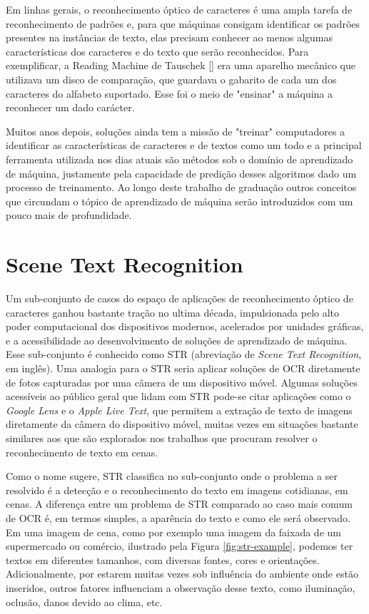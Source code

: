 Em linhas gerais, o reconhecimento óptico de caracteres é uma ampla tarefa de reconhecimento de padrões e, para que máquinas consigam identificar os padrões presentes na instâncias de texto, elas precisam conhecer ao menos algumas características dos caracteres e do texto que serão reconhecidos. Para exemplificar, a Reading Machine de Tauschek [] era uma aparelho mecânico que utilizava um disco de comparação, que guardava o gabarito de cada um dos caracteres do alfabeto suportado. Esse foi o meio de "ensinar" a máquina a reconhecer um dado carácter.

Muitos anos depois, soluções ainda tem a missão de "treinar" computadores a identificar as características de caracteres e de textos como um todo e a principal ferramenta utilizada nos dias atuais são métodos sob o domínio de aprendizado de máquina, justamente pela capacidade de predição desses algoritmos dado um processo de treinamento. Ao longo deste trabalho de graduação outros conceitos que circundam o tópico de aprendizado de máquina serão introduzidos com um pouco mais de profundidade.

\section{Scene Text Recognition}

Um sub-conjunto de casos do espaço de aplicações de reconhecimento óptico de caracteres ganhou bastante tração no ultima década, impulsionada pelo alto poder computacional dos dispositivos modernos, acelerados por unidades gráficas, e a acessibilidade ao desenvolvimento de soluções de aprendizado de máquina. Esse sub-conjunto é conhecido como STR (abreviação de \textit{Scene Text Recognition}, em inglês). Uma analogia para o STR seria aplicar soluções de OCR diretamente de fotos capturadas por uma câmera de um dispositivo móvel. Algumas soluções acessíveis ao público geral que lidam com STR  pode-se citar aplicações como o \textit{Google Lens} e o \textit{Apple Live Text}, que permitem a extração de texto de imagens diretamente da câmera do dispositivo móvel, muitas vezes em situações bastante similares aos que são explorados nos trabalhos que procuram resolver o reconhecimento de texto em cenas.

Como o nome sugere, STR classifica no sub-conjunto onde o problema a ser resolvido é a detecção e o reconhecimento do texto em imagens cotidianas, em cenas. A diferença entre um problema de STR comparado ao caso mais comum de OCR é, em termos simples, a aparência do texto e como ele será observado. Em uma imagem de cena, como por exemplo uma imagem da faixada de um supermercado ou comércio, ilustrado pela Figura \ref{fig:str-example}, podemos ter textos em diferentes tamanhos, com diversas fontes, cores e orientações. Adicionalmente, por estarem muitas vezes sob influência do ambiente onde estão inseridos, outros fatores influenciam a observação desse texto, como iluminação, oclusão, danos devido ao clima, etc.

